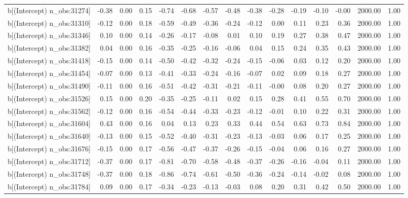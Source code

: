 \begin{table}[ht]
\begin{tabular}{rrrrrrrrrrrrrrr}
  b[(Intercept) n\_obs:31274] & -0.38 & 0.00 & 0.15 & -0.74 & -0.68 & -0.57 & -0.48 & -0.38 & -0.28 & -0.19 & -0.10 & -0.00 & 2000.00 & 1.00 \\ 
  b[(Intercept) n\_obs:31310] & -0.12 & 0.00 & 0.18 & -0.59 & -0.49 & -0.36 & -0.24 & -0.12 & 0.00 & 0.11 & 0.23 & 0.36 & 2000.00 & 1.00 \\ 
  b[(Intercept) n\_obs:31346] & 0.10 & 0.00 & 0.14 & -0.26 & -0.17 & -0.08 & 0.01 & 0.10 & 0.19 & 0.27 & 0.38 & 0.47 & 2000.00 & 1.00 \\ 
  b[(Intercept) n\_obs:31382] & 0.04 & 0.00 & 0.16 & -0.35 & -0.25 & -0.16 & -0.06 & 0.04 & 0.15 & 0.24 & 0.35 & 0.43 & 2000.00 & 1.00 \\ 
  b[(Intercept) n\_obs:31418] & -0.15 & 0.00 & 0.14 & -0.50 & -0.42 & -0.32 & -0.24 & -0.15 & -0.06 & 0.03 & 0.12 & 0.20 & 2000.00 & 1.00 \\ 
  b[(Intercept) n\_obs:31454] & -0.07 & 0.00 & 0.13 & -0.41 & -0.33 & -0.24 & -0.16 & -0.07 & 0.02 & 0.09 & 0.18 & 0.27 & 2000.00 & 1.00 \\ 
  b[(Intercept) n\_obs:31490] & -0.11 & 0.00 & 0.16 & -0.51 & -0.42 & -0.31 & -0.21 & -0.11 & -0.00 & 0.08 & 0.20 & 0.27 & 2000.00 & 1.00 \\ 
  b[(Intercept) n\_obs:31526] & 0.15 & 0.00 & 0.20 & -0.35 & -0.25 & -0.11 & 0.02 & 0.15 & 0.28 & 0.41 & 0.55 & 0.70 & 2000.00 & 1.00 \\ 
  b[(Intercept) n\_obs:31562] & -0.12 & 0.00 & 0.16 & -0.54 & -0.44 & -0.33 & -0.23 & -0.12 & -0.01 & 0.10 & 0.22 & 0.31 & 2000.00 & 1.00 \\ 
  b[(Intercept) n\_obs:31604] & 0.43 & 0.00 & 0.16 & 0.04 & 0.13 & 0.23 & 0.33 & 0.44 & 0.54 & 0.63 & 0.73 & 0.84 & 2000.00 & 1.00 \\ 
  b[(Intercept) n\_obs:31640] & -0.13 & 0.00 & 0.15 & -0.52 & -0.40 & -0.31 & -0.23 & -0.13 & -0.03 & 0.06 & 0.17 & 0.25 & 2000.00 & 1.00 \\ 
  b[(Intercept) n\_obs:31676] & -0.15 & 0.00 & 0.17 & -0.56 & -0.47 & -0.37 & -0.26 & -0.15 & -0.04 & 0.06 & 0.16 & 0.27 & 2000.00 & 1.00 \\ 
  b[(Intercept) n\_obs:31712] & -0.37 & 0.00 & 0.17 & -0.81 & -0.70 & -0.58 & -0.48 & -0.37 & -0.26 & -0.16 & -0.04 & 0.11 & 2000.00 & 1.00 \\ 
  b[(Intercept) n\_obs:31748] & -0.37 & 0.00 & 0.18 & -0.86 & -0.74 & -0.61 & -0.50 & -0.36 & -0.24 & -0.14 & -0.02 & 0.08 & 2000.00 & 1.00 \\ 
  b[(Intercept) n\_obs:31784] & 0.09 & 0.00 & 0.17 & -0.34 & -0.23 & -0.13 & -0.03 & 0.08 & 0.20 & 0.31 & 0.42 & 0.50 & 2000.00 & 1.00 \\ 

\end{tabular}
\end{table}
